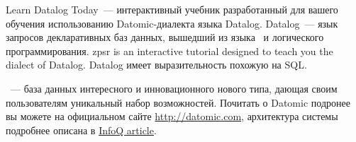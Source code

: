 \secdown


Learn Datalog Today\ --- интерактивный учебник разработанный для вашего обучения
использованию Datomic-диалекта языка Datalog. Datalog\ --- язык запросов
декларативных баз данных, вышедший из языка \prolog\ и логического
программирования. zpsr is an interactive tutorial designed to teach you the
dialect of Datalog. Datalog имеет выразительность похожую на SQL.

\ --- база данных интересного и инновационного нового типа, дающая
своим пользователям уникальный набор возможностей. Почитать о Datomic подронее
вы можете на официальном сайте \url{http://datomic.com}, архитектура системы
подробнее описана в
\href{http://www.infoq.com/articles/Architecture-Datomic}{InfoQ article}.

\secup %